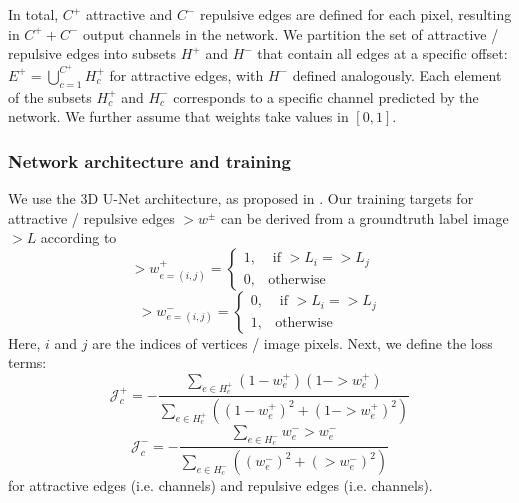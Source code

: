 In total, $C^+$ attractive and $C^-$ repulsive edges are defined for each pixel, resulting in $C^+ + C^-$ output channels in the network. 
We partition the set of attractive / repulsive edges into subsets $H^+$ and $H^-$ that contain all edges at a specific offset:
$\label{edgesets}
    E^+ = {\bigcup_{c=1}^{C^+}} H^+_{c}$ for attractive edges, with $H^{-}$ defined analogously. 
Each element of the subsets $H^+_{c}$ and $H^-_{c}$ corresponds to a specific channel predicted by the network. We further assume that weights take values in $[0,1]$.%

\subsubsection*{Network architecture and training}
We use the 3D U-Net \cite{ronneberger_15_u-net, cciccek20163d} architecture, as proposed in \cite{funke2018large}. %
Our training targets for attractive / repulsive edges $\gt{w}^\pm$ can be derived from a groundtruth label image $\gt{L}$ according to
\begin{equation}
    \gt{w}^+_{e=(i, j)} = \begin{cases}
        1 , &\text{ if } \gt{L}_i = \gt{L}_j\\
        0 , & \text{otherwise}
    \end{cases}\quad
\end{equation}
\begin{equation}
    \gt{w}^-_{e=(i, j)} = \begin{cases}
        0 , &\text{ if } \gt{L}_i = \gt{L}_j\\
        1 , & \text{otherwise}
    \end{cases}
\end{equation}
Here, $i$ and $j$ are the indices of vertices / image pixels.
Next, we define the loss terms:
\begin{equation} \label{dice_plus}
    \mathcal{J}^+_{c} = - \frac{\sum_{e \in H^+_{c}} (1 - w^+_e) (1 - \gt{w}^+_e)}{\sum_{e \in H^+_{c}} ((1 - w^+_e)^2 + (1 -\gt{w}^+_e)^2)} 
\end{equation}\label{dice_minus}
\begin{equation}
 \mathcal{J}^-_{c} = - \frac{\sum_{e \in H^-_{c}} w^-_e {\gt{w}^-_e}}{\sum_{e \in H^-_{c}} ((w^-_e)^2 + (\gt{w}^-_e)^2)}
\end{equation}
for attractive edges (i.e. channels) and repulsive edges (i.e. channels).

